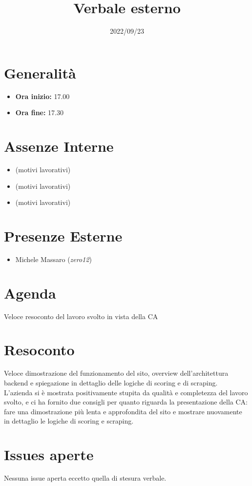 \documentclass{classes/base}
\title{Verbale esterno}
\date{2022/09/23}
\author{\marcob}
\renewcommand{\maketitle}{
    
}
\begin{document}
    \maketitle

    \section*{Generalità}
    \begin{itemize}
        \item \textbf{Ora inizio:} 17.00
        \item \textbf{Ora fine:} 17.30
    \end{itemize}

    \section*{Assenze Interne}
    \begin{itemize}
    	\item \angela{} (motivi lavorativi)
        \item \matteo{} (motivi lavorativi)
        \item \ruth{} (motivi lavorativi)
    \end{itemize}
    \section*{Presenze Esterne}
    \begin{itemize}
    	\item Michele Massaro (\textit{zero12})
    \end{itemize}

    \section*{Agenda}
    Veloce resoconto del lavoro svolto in vista della CA

    \section*{Resoconto}
    Veloce dimostrazione del funzionamento del sito, overview dell'architettura backend e spiegazione
    in dettaglio delle logiche di scoring e di scraping.\\
    L'azienda si è mostrata positivamente stupita da qualità e completezza del lavoro svolto, e ci ha
    fornito due consigli per quanto riguarda la presentazione della CA: fare una dimostrazione più
    lenta e approfondita del sito e mostrare nuovamente in dettaglio le logiche di scoring e scraping.\\
    
    \section*{Issues aperte}
    Nessuna issue aperta eccetto quella di stesura verbale.
\end{document}
